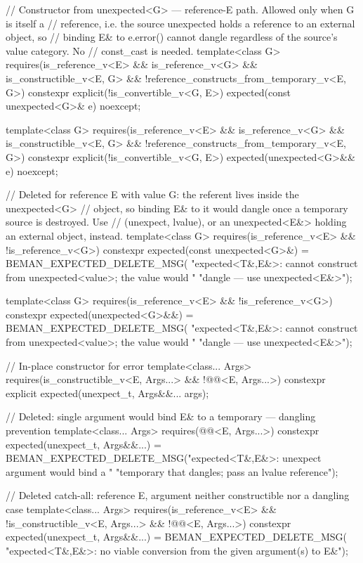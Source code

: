\begin{codeblock}
{{    // Constructor from unexpected<G> — reference-E path. Allowed only when G is itself a
    // reference, i.e. the source unexpected holds a reference to an external object, so
    // binding E& to e.error() cannot dangle regardless of the source's value category. No
    // const_cast is needed.
    template<class G>
      requires(is_reference_v<E> && is_reference_v<G> && is_constructible_v<E, G> &&
               !reference_constructs_from_temporary_v<E, G>)
    constexpr explicit(!is_convertible_v<G, E>) expected(const unexpected<G>& e) noexcept;

    template<class G>
      requires(is_reference_v<E> && is_reference_v<G> && is_constructible_v<E, G> &&
               !reference_constructs_from_temporary_v<E, G>)
    constexpr explicit(!is_convertible_v<G, E>) expected(unexpected<G>&& e) noexcept;

    // Deleted for reference E with value G: the referent lives inside the unexpected<G>
    // object, so binding E& to it would dangle once a temporary source is destroyed. Use
    // (unexpect, lvalue), or an unexpected<E&> holding an external object, instead.
    template<class G>
      requires(is_reference_v<E> && !is_reference_v<G>)
    constexpr expected(const unexpected<G>&) = BEMAN_EXPECTED_DELETE_MSG(
        "expected<T&,E&>: cannot construct from unexpected<value>; the value would "
        "dangle — use unexpected<E&>");

    template<class G>
      requires(is_reference_v<E> && !is_reference_v<G>)
    constexpr expected(unexpected<G>&&) = BEMAN_EXPECTED_DELETE_MSG(
        "expected<T&,E&>: cannot construct from unexpected<value>; the value would "
        "dangle — use unexpected<E&>");

    // In-place constructor for error
    template<class... Args>
      requires(is_constructible_v<E, Args...> && !@@<E, Args...>)
    constexpr explicit expected(unexpect_t, Args&&... args);

    // Deleted: single argument would bind E& to a temporary — dangling prevention
    template<class... Args>
      requires(@@<E, Args...>)
    constexpr expected(unexpect_t, Args&&...) =
        BEMAN_EXPECTED_DELETE_MSG("expected<T&,E&>: unexpect argument would bind a "
                                  "temporary that dangles; pass an lvalue reference");

    // Deleted catch-all: reference E, argument neither constructible nor a dangling case
    template<class... Args>
      requires(is_reference_v<E> && !is_constructible_v<E, Args...> &&
               !@@<E, Args...>)
    constexpr expected(unexpect_t, Args&&...) = BEMAN_EXPECTED_DELETE_MSG(
        "expected<T&,E&>: no viable conversion from the given argument(s) to E&");

}}
\end{codeblock}
